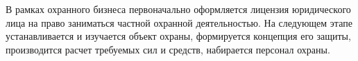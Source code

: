 \documentclass[a4paper,12pt,fleqn]{article} %
\begin{document}
В рамках охранного бизнеса первоначально оформляется лицензия юридического лица на право заниматься частной охранной деятельностью. На следующем этапе устанавливается и изучается объект охраны, формируется концепция его защиты, производится расчет требуемых сил и средств, набирается персонал охраны.

\end{document}

